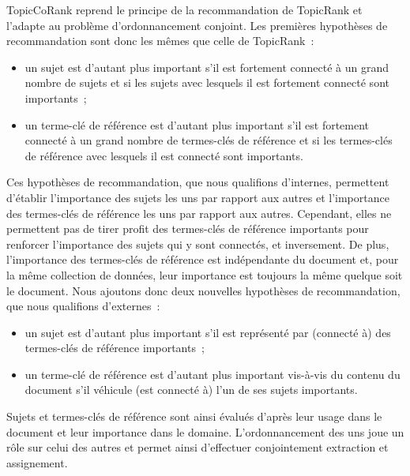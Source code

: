         TopicCoRank reprend le principe de la recommandation de TopicRank et
        l'adapte au problème d'ordonnancement conjoint. Les premières hypothèses
        de recommandation sont donc les mêmes que celle de TopicRank~:
        \begin{itemize}
          \item{un sujet est d'autant plus important s'il est fortement connecté
                à un grand nombre de sujets et si les sujets avec lesquels il
                est fortement connecté sont importants~;}
          \item{un terme-clé de référence est d'autant plus important s'il est
                fortement connecté à un grand nombre de termes-clés de référence
                et si les termes-clés de référence avec lesquels il est connecté
                sont importants.}
        \end{itemize}
        Ces hypothèses de recommandation, que nous qualifions d'internes,
        permettent d'établir l'importance des sujets les uns par rapport aux
        autres et l'importance des termes-clés de référence les uns par rapport
        aux autres. Cependant, elles ne permettent pas de tirer profit des
        termes-clés de référence importants pour renforcer l'importance des
        sujets qui y sont connectés, et inversement. De plus,
        l'importance des termes-clés de référence est indépendante du document
        et, pour la même collection de données, leur importance est toujours la
        même quelque soit le document. Nous ajoutons donc deux nouvelles
        hypothèses de recommandation, que nous qualifions d'externes~:
        \begin{itemize}
          \item{un sujet est d'autant plus important s'il est représenté par
                (connecté à) des termes-clés de référence importants~;}
          \item{un terme-clé de référence est d'autant plus important vis-à-vis
                du contenu du document s'il véhicule (est connecté à) l'un de
                ses sujets importants.}
        \end{itemize}
        Sujets et termes-clés de référence sont ainsi évalués d'après leur usage
        dans le document et leur importance dans le domaine. L'ordonnancement
        des uns joue un rôle sur celui des autres et permet ainsi d'effectuer
        conjointement extraction et assignement.

